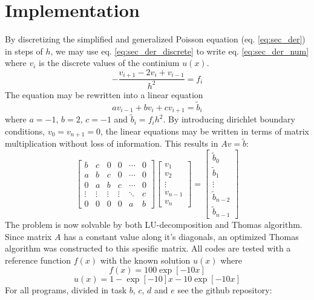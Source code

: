 \documentclass[twoside,twocolumn]{article}
\begin{document}
\section{Implementation}
By discretizing the simplified and generalized Poisson equation (eq. \ref{eq:sec_der}) in steps of $h$, we may use eq. \ref{eq:sec_der_discrete} to write eq. \ref{eq:sec_der_num} where $v_i$ is the discrete values of the continium $u(x)$.
\begin{equation}
-\frac{v_{i+1}-2v_i+v_{i-1}}{h^2}=f_i \label{eq:sec_der_num}
\end{equation}
The equation may be rewritten into a linear equation
\begin{equation*}
av_{i-1}+bv_i+cv_{i+1}=\tilde{b}_i 
\end{equation*}
where $a=-1$, $b=2$, $c=-1$ and $\tilde{b}_i=f_ih^2$. By introducing dirichlet boundary conditions, $v_0=v_{n+1}=0$, the linear equations may be written in terms of matrix multiplication without loss of information. This results in $Av=\tilde{b}$:
\begin{equation}
\begin{bmatrix}
b&c&0&0&\cdots &0\\
a&b&c&0& \cdots & 0\\
0&a&b&c& \cdots & 0\\
\vdots&\vdots&\vdots&\vdots&\ddots&c\\
0&0&0&0&a&b
\end{bmatrix}
\begin{bmatrix}
v_1\\v_2\\\vdots\\v_{n-1}\\v_{n}
\end{bmatrix}=
\begin{bmatrix}
\tilde{b}_0\\\tilde{b}_1\\\vdots\\\tilde{b}_{n-2}\\\tilde{b}_{n-1}
\end{bmatrix} \label{eq:problem}
\end{equation}
The problem is now solvable by both LU-decomposition and Thomas algorithm. Since matrix $A$ has a constant value along it's diagonals, an optimized Thomas algorithm was constructed to this spesific matrix. All codes are tested with a reference function $f(x)$ with the known solution $u(x)$ where
\begin{equation*}
f(x)=100\exp[-10x]
\end{equation*}
\begin{equation*}
u(x)=1-\exp[-10]x-10\exp[-10x]
\end{equation*}
For all programs, divided in task $b$, $c$, $d$ and $e$ see the github repository: 
\end{document}
